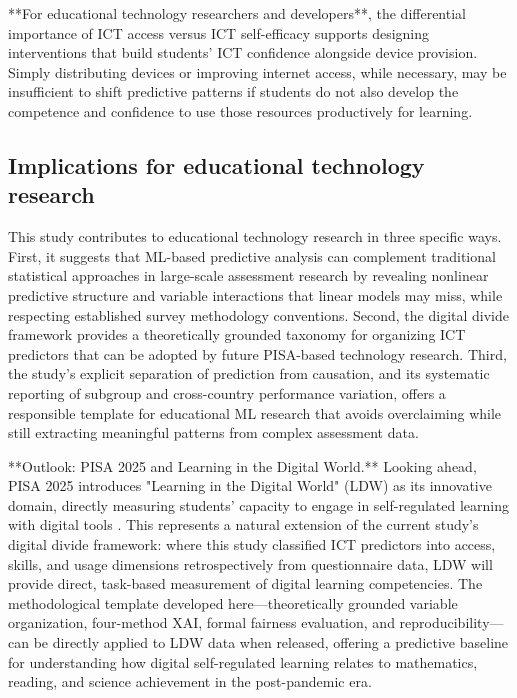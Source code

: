\documentclass[pdflatex,sn-mathphys-ay]{sn-jnl}
\begin{document}
**For educational technology researchers and developers**, the differential importance of ICT access versus ICT self-efficacy supports designing interventions that build students' ICT confidence alongside device provision. Simply distributing devices or improving internet access, while necessary, may be insufficient to shift predictive patterns if students do not also develop the competence and confidence to use those resources productively for learning.

\subsection{Implications for educational technology research}

This study contributes to educational technology research in three specific ways. First, it suggests that ML-based predictive analysis can complement traditional statistical approaches in large-scale assessment research by revealing nonlinear predictive structure and variable interactions that linear models may miss, while respecting established survey methodology conventions. Second, the digital divide framework provides a theoretically grounded taxonomy for organizing ICT predictors that can be adopted by future PISA-based technology research. Third, the study's explicit separation of prediction from causation, and its systematic reporting of subgroup and cross-country performance variation, offers a responsible template for educational ML research that avoids overclaiming while still extracting meaningful patterns from complex assessment data.

**Outlook: PISA 2025 and Learning in the Digital World.** Looking ahead, PISA 2025 introduces "Learning in the Digital World" (LDW) as its innovative domain, directly measuring students' capacity to engage in self-regulated learning with digital tools \citep{OECD_2025_LDW}. This represents a natural extension of the current study's digital divide framework: where this study classified ICT predictors into access, skills, and usage dimensions retrospectively from questionnaire data, LDW will provide direct, task-based measurement of digital learning competencies. The methodological template developed here---theoretically grounded variable organization, four-method XAI, formal fairness evaluation, and reproducibility---can be directly applied to LDW data when released, offering a predictive baseline for understanding how digital self-regulated learning relates to mathematics, reading, and science achievement in the post-pandemic era.
\end{document}
